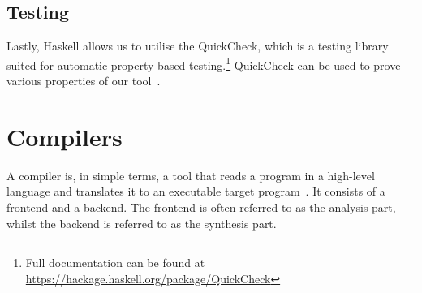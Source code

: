 \subsection{Testing}

Lastly, Haskell allows us to utilise the QuickCheck, which is a testing library suited for automatic property-based testing.\footnote{Full documentation can be found at \url{https://hackage.haskell.org/package/QuickCheck}} QuickCheck can be used to prove various properties of our tool~\cite{DBLP:conf/icfp/ClaessenH00}.

\section{Compilers}

A compiler is, in simple terms, a tool that reads a program in a high-level language and translates it to an executable target program~\cite{DBLP:books/aw/AhoSU86}. It consists of a frontend and a backend. The frontend is often referred to as the analysis part, whilst the backend is referred to as the synthesis part. \hfill \\

